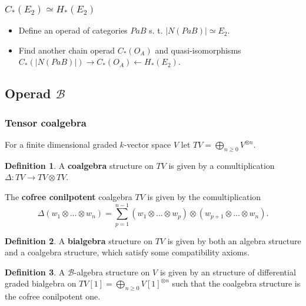 \documentclass{beamer}
\theoremstyle{definition}
\newtheorem{defi}{Definition}
\begin{document}
\begin{frame}
\frametitle{$C_*(E_2)\simeq H_*(E_2)$}
\begin{itemize}
	\item Define an operad of categories $PaB$ s. t. $|N(PaB)|\simeq E_2$. \checkmark
	\item Find another chain operad $C_*(O_A)$ and quasi-isomorphisms $C_*(|N(PaB)|)\to C_*(O_A)\leftarrow H_*(E_2)$. \checkmark
\end{itemize}
\end{frame}
\subsection{Operad $\mathcal{B}$}

\begin{frame}
\frametitle{Tensor coalgebra}

	For a finite dimensional graded $k$-vector space $V$ let $TV=\bigoplus_{n\geq 0} V^{\otimes n}$. \pause
	
	\begin{defi}
		A \textbf{coalgebra} structure on $TV$ is given by a comultiplication $\Delta:TV\to TV\otimes TV$. 
	\end{defi}\pause

\begin{example}
	The \textbf{cofree conilpotent} coalgebra $TV$ is given by the comultiplication
	\[
\Delta(w_1\otimes \ldots \otimes w_n) = \sum_{p=1}^{n-1} (w_1\otimes \ldots \otimes w_p)\otimes(w_{p+1}\otimes \ldots \otimes w_n).
\]
\end{example}

\end{frame}

\begin{frame}
\begin{defi}
	A \textbf{bialgebra} structure on $TV$ is given by both an algebra structure and a coalgebra structure, which satisfy some compatibility axioms.
\end{defi}\pause

\begin{defi}
	A $\mathcal{B}$-algebra structure on $V$  is given by an structure of differential graded bialgebra on $TV[1]=\bigoplus_{n\geq 0} V[1]^{\otimes n}$ such that the coalgebra structure is the cofree conilpotent one.
\end{defi}
\end{frame}
\end{document}
